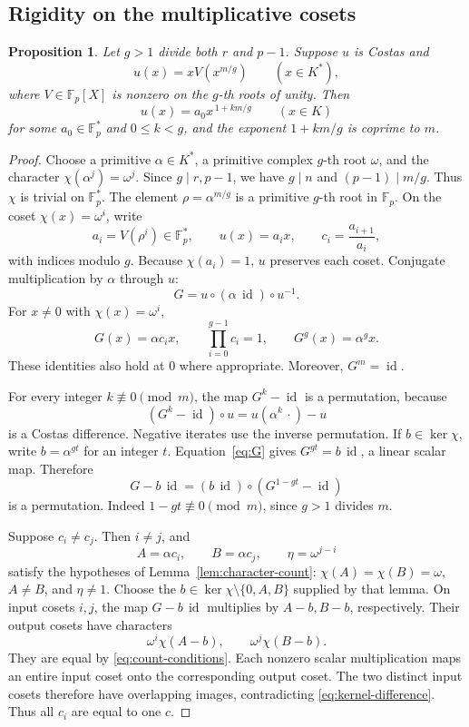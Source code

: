 \documentclass[11pt]{article}
\newtheorem{proposition}[theorem]{Proposition}
\theoremstyle{definition}
\theoremstyle{remark}
\newcommand{\Fp}{\mathbb F_p}
\newcommand{\id}{\operatorname{id}}
\numberwithin{equation}{section}
\begin{document}
\subsection{Rigidity on the multiplicative cosets}

\begin{proposition}\label{prop:cyclotomic-rigidity}
Let \(g>1\) divide both \(r\) and \(p-1\).
Suppose \(u\) is Costas and
\[
 u(x)=xV(x^{m/g})\qquad(x\in K^*),
\]
where \(V\in\Fp[X]\) is nonzero on the \(g\)-th roots of unity.
Then
\[
 u(x)=a_0x^{\,1+km/g}\qquad(x\in K)
\]
for some \(a_0\in\Fp^*\) and \(0\le k<g\), and the exponent
\(1+km/g\) is coprime to \(m\).
\end{proposition}
\begin{proof}
Choose a primitive \(\alpha\in K^*\), a primitive complex
\(g\)-th root \(\omega\), and the character
\(\chi(\alpha^j)=\omega^j\).
Since \(g\mid r,p-1\), we have \(g\mid n\) and
\((p-1)\mid m/g\). Thus \(\chi\) is trivial on \(\Fp^*\).
The element \(\rho=\alpha^{m/g}\) is a primitive \(g\)-th root
in \(\Fp\). On the coset \(\chi(x)=\omega^i\), write
\[
 a_i=V(\rho^i)\in\Fp^*,\qquad u(x)=a_i x,
 \qquad c_i=\frac{a_{i+1}}{a_i},
\]
with indices modulo \(g\).
Because \(\chi(a_i)=1\), \(u\) preserves each coset.
Conjugate multiplication by \(\alpha\) through \(u\):
\[
 G=u\circ(\alpha\,\id)\circ u^{-1}.
\]
For \(x\ne0\) with \(\chi(x)=\omega^i\),
\begin{equation}\label{eq:G}
 G(x)=\alpha c_i x,\qquad
 \prod_{i=0}^{g-1}c_i=1,\qquad
 G^g(x)=\alpha^g x.
\end{equation}
These identities also hold at \(0\) where appropriate.
Moreover, \(G^m=\id\).

For every integer \(k\not\equiv0\pmod m\), the map \(G^k-\id\)
is a permutation, because
\[
 (G^k-\id)\circ u
      =u(\alpha^k\,\cdot)-u
\]
is a Costas difference. Negative iterates use the inverse permutation.
If \(b\in\ker\chi\), write \(b=\alpha^{gt}\) for an integer \(t\).
Equation~\eqref{eq:G} gives \(G^{gt}=b\,\id\), a linear scalar map.
Therefore
\begin{equation}\label{eq:kernel-difference}
 G-b\,\id=(b\,\id)\circ(G^{1-gt}-\id)
\end{equation}
is a permutation. Indeed \(1-gt\not\equiv0\pmod m\), since
\(g>1\) divides \(m\).

Suppose \(c_i\ne c_j\). Then \(i\ne j\), and
\[
 A=\alpha c_i,\qquad B=\alpha c_j,\qquad
 \eta=\omega^{j-i}
\]
satisfy the hypotheses of Lemma~\ref{lem:character-count}:
\(\chi(A)=\chi(B)=\omega\), \(A\ne B\), and \(\eta\ne1\).
Choose the \(b\in\ker\chi\setminus\{0,A,B\}\) supplied by that lemma.
On input cosets \(i,j\), the map \(G-b\,\id\) multiplies by
\(A-b,B-b\), respectively. Their output cosets have characters
\[
 \omega^i\chi(A-b),\qquad \omega^j\chi(B-b).
\]
They are equal by \eqref{eq:count-conditions}.
Each nonzero scalar multiplication maps an entire input coset onto
the corresponding output coset. The two distinct input cosets
therefore have overlapping images, contradicting
\eqref{eq:kernel-difference}. Thus all \(c_i\) are equal to one \(c\).


\end{proof}
\end{document}
